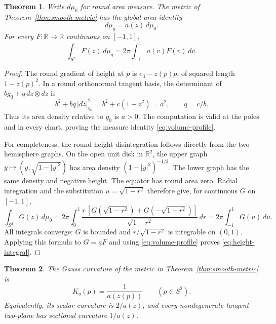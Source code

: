 \documentclass[11pt]{article}
\newtheorem{theorem}{Theorem}[section]
\newcommand{\R}{\mathbb R}
\begin{document}
\begin{theorem}\label{thm:volume-height}
Write $d\mu_0$ for round area measure. The metric of
Theorem~\ref{thm:smooth-metric} has the global area identity
\begin{equation}\label{eq:volume-profile}
 d\mu_g=a(z)\,d\mu_0.
\end{equation}
For every $F:\R\to\R$ continuous on $[-1,1]$,
\begin{equation}\label{eq:height-integral}
 \int_{S^2}F(z)\,d\mu_g
   =2\pi\int_{-1}^1 a(v)F(v)\,dv.
\end{equation}
\end{theorem}

\begin{proof}
The round gradient of height at $p$ is $e_3-z(p)p$, of squared length
$1-z(p)^2$. In a round orthonormal tangent basis, the determinant of
$b g_0+q\,dz\otimes dz$ is
\[
 b^2+bq\,|dz|_{g_0}^2=b^2+c(1-z^2)=a^2,
 \qquad q=c/b.
\]
Thus its area density relative to $g_0$ is $a>0$. The computation is
valid at the poles and in every chart, proving the measure identity
\eqref{eq:volume-profile}.

For completeness, the round height disintegration follows directly
from the two hemisphere graphs. On the open unit disk in $\R^2$,
the upper graph $y\mapsto(y,\sqrt{1-|y|^2})$ has area density
$(1-|y|^2)^{-1/2}$. The lower graph has the same density and negative
height. The equator has round area zero. Radial integration and the
substitution $u=\sqrt{1-r^2}$ therefore give, for continuous $G$ on
$[-1,1]$,
\[
 \int_{S^2}G(z)\,d\mu_0
 =2\pi\int_0^1
   \frac{r\,[G(\sqrt{1-r^2})+G(-\sqrt{1-r^2})]}{\sqrt{1-r^2}}\,dr
 =2\pi\int_{-1}^1G(u)\,du.
\]
All integrals converge: $G$ is bounded and
$r/\sqrt{1-r^2}$ is integrable on $(0,1)$.
Applying this formula to $G=aF$ and using \eqref{eq:volume-profile}
proves \eqref{eq:height-integral}.
\end{proof}

\begin{theorem}\label{thm:curvature-profile}
The Gauss curvature of the metric in Theorem~\ref{thm:smooth-metric} is
\begin{equation}\label{eq:curvature-profile}
 K_g(p)=\frac1{a(z(p))}\qquad(p\in S^2).
\end{equation}
Equivalently, its scalar curvature is $2/a(z)$, and every nondegenerate
tangent two-plane has sectional curvature $1/a(z)$.
\end{theorem}
\end{document}
